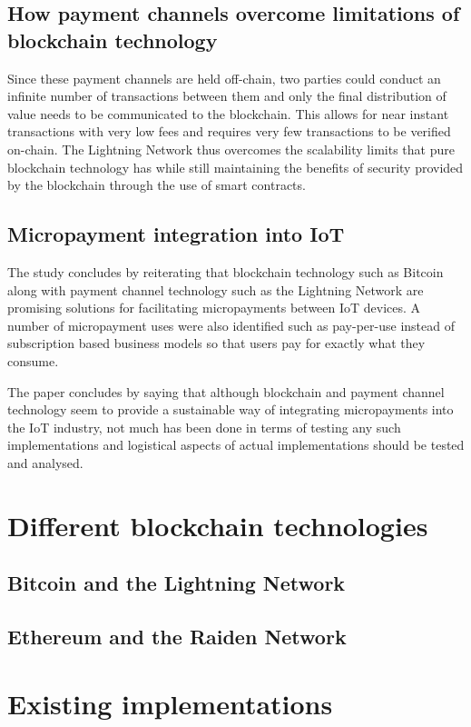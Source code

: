 \subsection{How payment channels overcome limitations of blockchain technology}

Since these payment channels are held off-chain, two parties could conduct an infinite number of transactions between them and only the final distribution of value needs to be communicated to the blockchain. This allows for near instant transactions with very low fees and requires very few transactions to be verified on-chain. The Lightning Network thus overcomes the scalability limits that pure blockchain technology has while still maintaining the benefits of security provided by the blockchain through the use of smart contracts.

\subsection{Micropayment integration into IoT}

The study concludes by reiterating that blockchain technology such as Bitcoin along with payment channel technology such as the Lightning Network are promising solutions for facilitating micropayments between IoT devices. A number of micropayment uses were also identified such as pay-per-use instead of subscription based business models so that users pay for exactly what they consume. 

The paper concludes by saying that although blockchain and payment channel technology seem to provide a sustainable way of integrating micropayments into the IoT industry, not much has been done in terms of testing any such implementations and logistical aspects of actual implementations should be tested and analysed.

\section{Different blockchain technologies}


\subsection{Bitcoin and the Lightning Network}

\subsection{Ethereum and the Raiden Network}

\section{Existing implementations}